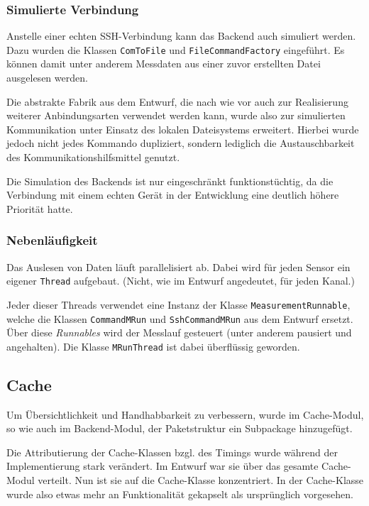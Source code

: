 \documentclass[parskip=full]{scrartcl}
\begin{document}
\subsubsection{Simulierte Verbindung}

Anstelle einer echten SSH-Verbindung kann das Backend auch simuliert werden. Dazu wurden die Klassen \verb:ComToFile: und \verb:FileCommandFactory: eingeführt. Es können damit unter anderem Messdaten aus einer zuvor erstellten Datei ausgelesen werden.

Die abstrakte Fabrik aus dem Entwurf, die nach wie vor auch zur Realisierung weiterer Anbindungsarten verwendet werden kann, wurde also zur simulierten Kommunikation unter Einsatz des lokalen Dateisystems erweitert. Hierbei wurde jedoch nicht jedes Kommando dupliziert, sondern lediglich die Austauschbarkeit des Kommunikationshilfsmittel genutzt. 

Die Simulation des Backends ist nur eingeschränkt funktionstüchtig, da die Verbindung mit einem echten Gerät in der Entwicklung eine deutlich höhere Priorität hatte.

\subsubsection{Nebenläufigkeit}

Das Auslesen von Daten läuft parallelisiert ab. Dabei wird für jeden Sensor ein eigener \verb:Thread: aufgebaut. (Nicht, wie im Entwurf angedeutet, für jeden Kanal.)

Jeder dieser Threads verwendet eine Instanz der Klasse \verb:MeasurementRunnable:, welche die Klassen \verb:CommandMRun: und \verb:SshCommandMRun: aus dem Entwurf ersetzt. Über diese \textit{Runnables} wird der Messlauf gesteuert (unter anderem pausiert und angehalten). Die Klasse \verb:MRunThread: ist dabei überflüssig geworden.

\subsection{Cache}

Um Übersichtlichkeit und Handhabbarkeit zu verbessern, wurde im Cache-Modul, so wie auch im Backend-Modul, der Paketstruktur ein Subpackage hinzugefügt. 

Die Attributierung der Cache-Klassen bzgl. des Timings wurde während der Implementierung stark verändert. Im Entwurf war sie über das gesamte Cache-Modul verteilt. Nun ist sie auf die Cache-Klasse konzentriert. In der Cache-Klasse wurde also etwas mehr an Funktionalität gekapselt als ursprünglich vorgesehen. 
\end{document}
